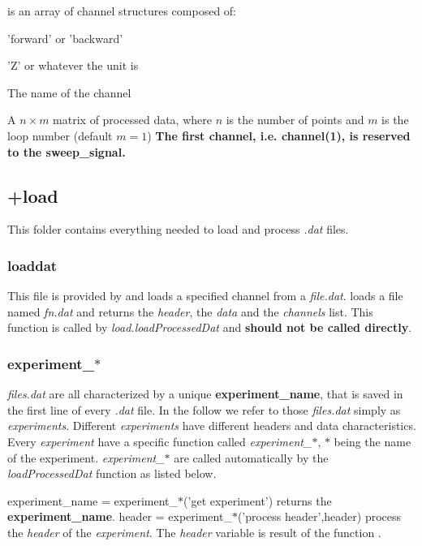 \item[channels] is an array of channel structures composed of:
  \bdf
  \item[Direction] 'forward' or 'backward'
  \item[Unit] 'Z' or whatever the unit is
  \item[Name] The name of the channel
  \item[data] A $n\times m$ matrix of processed data, where $n$ is the number of points and $m$ is the loop number (default $m=1$)
  \edf
\edf
\textbf{The first channel, i.e. channel(1), is reserved to the sweep\_signal.}

\subsection{+load}
This folder contains everything needed to load and process \emph{.dat} files.
\subsubsection{loaddat}
This file is provided by \nanonis{} and loads a specified channel from a \emph{file.dat}.
\bdf
{} loads a file named \emph{fn.dat} and returns the \emph{header}, the \emph{data} and the \emph{channels} list.
 This function is called by \emph{load.loadProcessedDat} and \textbf{should not be called directly}.
\edf
\subsubsection{experiment\_$\ast$}
\emph{files.dat} are all characterized by a unique \textbf{experiment\_name}, that is saved in the first line of every \emph{.dat} file.
In the follow we refer to those \emph{files.dat} simply as \emph{experiments}.
Different \emph{experiments} have different headers and data characteristics.
Every \emph{experiment} have a specific function called \emph{experiment\_$\ast$}, \emph{$\ast$} being the name of the experiment.
\emph{experiment\_$\ast$} are called automatically by the \emph{loadProcessedDat} function as listed below.

\bdf
\+ {experiment\_name = experiment\_$\ast$('get experiment')} returns the \textbf{experiment\_name}.
\+ {header = experiment\_$\ast$('process header',header)} process the \emph{header} of the \emph{experiment}. 
The \emph{header} variable is result of the function .

